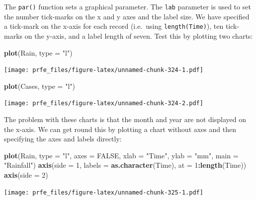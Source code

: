 \documentclass[12pt,]{book}
\newenvironment{Shaded}{\begin{snugshade}}{\end{snugshade}}
\newcommand{\KeywordTok}[1]{\textcolor[rgb]{0.13,0.29,0.53}{\textbf{#1}}}
\newcommand{\DataTypeTok}[1]{\textcolor[rgb]{0.13,0.29,0.53}{#1}}
\newcommand{\DecValTok}[1]{\textcolor[rgb]{0.00,0.00,0.81}{#1}}
\newcommand{\StringTok}[1]{\textcolor[rgb]{0.31,0.60,0.02}{#1}}
\newcommand{\OtherTok}[1]{\textcolor[rgb]{0.56,0.35,0.01}{#1}}
\newcommand{\OperatorTok}[1]{\textcolor[rgb]{0.81,0.36,0.00}{\textbf{#1}}}
\newcommand{\NormalTok}[1]{#1}
\theoremstyle{definition}
\theoremstyle{definition}
\theoremstyle{definition}
\theoremstyle{remark}
\begin{document}
The \texttt{par()} function sets a graphical parameter. The \texttt{lab}
parameter is used to set the number tick-marks on the x and y axes and
the label size. We have specified a tick-mark on the x-axis for each
record (i.e.~using \texttt{length(Time)}), ten tick-marks on the y-axis,
and a label length of seven. Test this by plotting two charts:

\begin{Shaded}
\begin{Highlighting}[]
\KeywordTok{plot}\NormalTok{(Rain, }\DataTypeTok{type =} \StringTok{"l"}\NormalTok{)}
\end{Highlighting}
\end{Shaded}

\texttt{[image: prfe\_files/figure-latex/unnamed-chunk-324-1.pdf]}

\begin{Shaded}
\begin{Highlighting}[]
\KeywordTok{plot}\NormalTok{(Cases, }\DataTypeTok{type =} \StringTok{"l"}\NormalTok{)}
\end{Highlighting}
\end{Shaded}

\texttt{[image: prfe\_files/figure-latex/unnamed-chunk-324-2.pdf]}

The problem with these charts is that the month and year are not
displayed on the x-axis. We can get round this by plotting a chart
without axes and then specifying the axes and labels directly:

\begin{Shaded}
\begin{Highlighting}[]
\KeywordTok{plot}\NormalTok{(Rain, }\DataTypeTok{type =} \StringTok{"l"}\NormalTok{, }\DataTypeTok{axes =} \OtherTok{FALSE}\NormalTok{, }\DataTypeTok{xlab =} \StringTok{"Time"}\NormalTok{, }\DataTypeTok{ylab =} \StringTok{"mm"}\NormalTok{, }\DataTypeTok{main =} \StringTok{"Rainfall"}\NormalTok{)}
\KeywordTok{axis}\NormalTok{(}\DataTypeTok{side =} \DecValTok{1}\NormalTok{, }\DataTypeTok{labels =} \KeywordTok{as.character}\NormalTok{(Time), }\DataTypeTok{at =} \DecValTok{1}\OperatorTok{:}\KeywordTok{length}\NormalTok{(Time))}
\KeywordTok{axis}\NormalTok{(}\DataTypeTok{side =} \DecValTok{2}\NormalTok{)}
\end{Highlighting}
\end{Shaded}

\texttt{[image: prfe\_files/figure-latex/unnamed-chunk-325-1.pdf]}
\end{document}

